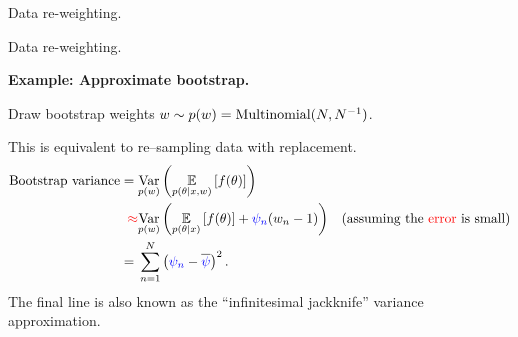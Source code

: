 \begin{frame}{Data re-weighting.}
%
\end{frame}





\begin{frame}[t]{Data re-weighting.}

    
    
    \textbf{Example: Approximate bootstrap.}
    
    Draw bootstrap
    weights $w \sim p(w) = \textrm{Multinomial}(N, N^{-1})$.

    This is equivalent to re--sampling data with replacement.
    \pause
    \begin{align*}
    \textrm{Bootstrap variance} ={}&
    \underset{p(w)}{\mathrm{Var}}\left(\underset{p(\theta \vert x, w)}{\mathbb{E}}\left[f(\theta)\right]\right) 
    \\\textcolor{red}{\approx}{}&
      \underset{p(w)}{\mathrm{Var}}\left(\underset{p(\theta \vert x)}{\mathbb{E}}\left[f(\theta)\right] + \textcolor{blue}{\psi_n}(w_n - 1)\right) 
    & \textrm{(assuming the \textcolor{red}{error} is small)}
    \\={}& \sum_{n=1}^N \left(\textcolor{blue}{\psi_n} - \overline{\textcolor{blue}{\psi}}\right)^2.
    \end{align*}
%
The final line is also known as the ``infinitesimal jackknife''
variance approximation.



\end{frame}
    






